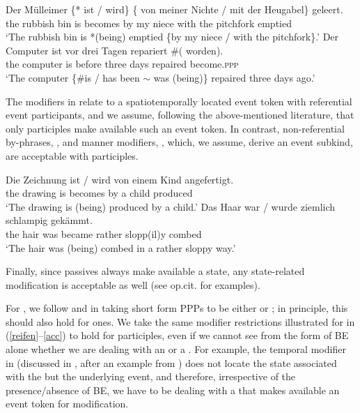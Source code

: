 \documentclass[output=paper,modfonts,newtxmath,hidelinks]{langscibook}
\begin{document}
\ea\label{reifen}
\ea\gll	Der M\"{u}lleimer \{*\hspace{-2pt} ist / wird\} \{\hspace{-2pt} von meiner Nichte / mit der Heugabel\} geleert.\\
	the {rubbish bin} {} is {} becomes {} by my niece {} with the pitchfork emptied\\
\glt	`The rubbish bin is *(being) emptied \{by my niece / with the pitchfork\}.'
\ex\gll	Der Computer ist vor drei Tagen repariert \#(\hspace{-2pt} worden).\\
	the computer is before three days repaired {} become.\textsc{ppp} \\
\glt	`The computer \{\#is / has been $\sim$ was (being)\} repaired three days ago.'
\z\z

\noindent The modifiers in  relate to a spatiotemporally located event token with referential event participants, and we assume, following the above-mentioned literature, that only  participles make available such an event token. In contrast, non-referential by-phrases, , and manner modifiers, , which, we assume,  derive an event subkind, are acceptable with  participles. 

\ea\label{acc}
\ea\gll	Die Zeichnung ist / wird von einem Kind angefertigt.\label{zeichnung}\\
	the drawing is {} becomes by a child produced \\
\glt	`The drawing is (being) produced by a child.'
\ex\gll	Das Haar war / wurde ziemlich schlampig gek\"{a}mmt.\label{schlampig}\\
	the hair was {} became rather slopp(il)y combed\\
\glt	`The hair was (being) combed in a rather sloppy way.'
\z\z

\noindent Finally, since  passives always make available a state, any state-related modification is acceptable as well (see op.cit. for examples).

For , we follow \citet{schoorlemmer95} and \citet{borik13, borik14} in  taking short form  PPPs to be either  or ; in principle, this should also hold for  ones. We take the same modifier restrictions illustrated for  in (\ref{reifen}--\ref{acc}) to hold for   participles, even if we cannot see from the form of BE alone whether we are dealing with an  or a  . For example, the temporal modifier in  (discussed in \citealt{borik14}, after an example from \citealt{paslawskastechow}) does not locate the state associated with the  but the underlying event, and therefore, irrespective of the presence/absence of BE, we have to be dealing with a   that makes available an event token for modification.
\end{document}
